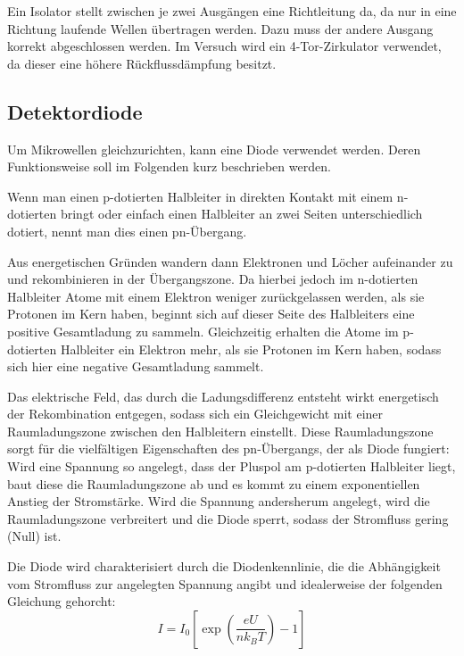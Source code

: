 \documentclass[
	a4paper,
	12pt,
	pagesize,
	ngerman
]{scrartcl}
\begin{document}
	Ein Isolator stellt zwischen je zwei Ausgängen eine Richtleitung da, da nur in eine Richtung laufende Wellen übertragen werden.
	Dazu muss der andere Ausgang korrekt abgeschlossen werden.
	Im Versuch wird ein 4-Tor-Zirkulator verwendet, da dieser eine höhere Rückflussdämpfung besitzt.

	\subsection{Detektordiode}

	Um Mikrowellen gleichzurichten, kann eine Diode verwendet werden.
	Deren Funktionsweise soll im Folgenden kurz beschrieben werden.

	Wenn man einen p-dotierten Halbleiter in direkten Kontakt mit einem n-dotierten bringt oder einfach einen Halbleiter an zwei Seiten unterschiedlich dotiert, nennt man dies einen pn-Übergang.

	Aus energetischen Gründen wandern dann Elektronen und Löcher aufeinander zu und rekombinieren in der Übergangszone.
	Da hierbei jedoch im n-dotierten Halbleiter Atome mit einem Elektron weniger zurückgelassen werden, als sie Protonen im Kern haben, beginnt sich auf dieser Seite des Halbleiters eine positive Gesamtladung zu sammeln.
	Gleichzeitig erhalten die Atome im p-dotierten Halbleiter ein Elektron mehr, als sie Protonen im Kern haben, sodass sich hier eine negative Gesamtladung sammelt.

	Das elektrische Feld, das durch die Ladungsdifferenz entsteht wirkt energetisch der Rekombination entgegen, sodass sich ein Gleichgewicht mit einer Raumladungszone zwischen den Halbleitern einstellt.
	Diese Raumladungszone sorgt für die vielfältigen Eigenschaften des pn-Übergangs, der als Diode fungiert:
	Wird eine Spannung so angelegt, dass der Pluspol am p-dotierten Halbleiter liegt, baut diese die Raumladungszone ab und es kommt zu einem exponentiellen Anstieg der Stromstärke.
	Wird die Spannung andersherum angelegt, wird die Raumladungszone verbreitert und die Diode sperrt, sodass der Stromfluss gering (Null) ist.

	Die Diode wird charakterisiert durch die Diodenkennlinie, die die Abhängigkeit vom Stromfluss zur angelegten Spannung angibt und idealerweise der folgenden Gleichung gehorcht:
	\begin{equation}
		\label{eq_diode_ideal}
		I = I_0 \left[ \exp \left( \frac{eU}{n k_B T} \right) -1 \right] %
	\end{equation}
\end{document}
